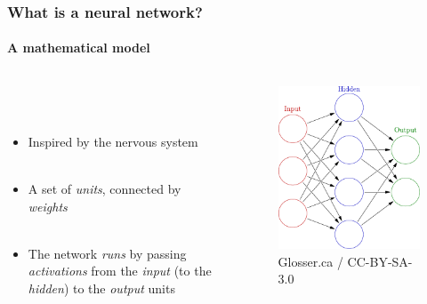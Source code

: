\documentclass{beamer}
\begin{document}
\begin{frame}
\frametitle{What is a neural network?}
\framesubtitle{A mathematical model}
 \begin{columns}[T]
    \begin{column}{.5\textwidth} 
     \ \\ 
     \ \\
\begin{itemize}
\item Inspired by the nervous system \\ \
 \item A set of \emph{units}, connected by \emph{weights} \\ \
\item The network \emph{runs} by passing \emph{activations} from the \emph{input} (to the \emph{hidden}) to the \emph{output} units \\ \
\end{itemize}
\end{column}
\begin{column}{.5\textwidth}
\begin{figure}
 
 \includegraphics[width=\linewidth]{./fig/3-layer.pdf}
 \caption{Glosser.ca / CC-BY-SA-3.0}
\end{figure}
\end{column}

\end{columns}
\end{frame}
\end{document}
